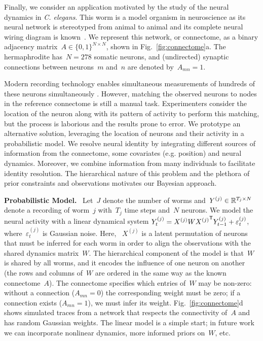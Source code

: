 \documentclass[twoside]{article}
\DeclareRobustCommand{\parhead}[1]{\textbf{#1}~}
\begin{document}
Finally, we consider an application motivated by the study of the
neural dynamics in \textit{C. elegans}. This worm is a model organism
in neuroscience as its neural network is stereotyped from animal to
animal and its complete neural wiring diagram is
known~\citep{varshney2011structural}.  We represent this network, or
connectome, as a binary adjacency
matrix~${A \in \{0,1\}^{N \times N}}$, shown in
Fig.~\ref{fig:connectome}a. The hermaphrodite has~${N=278}$ somatic
neurons, and (undirected) synaptic connections between neurons~$m$
and~$n$ are denoted by~$A_{mn}=1$.


Modern recording technology enables simultaneous measurements of
hundreds of these neurons simultaneously \citep{Kato2015,
  nguyen2016whole}.  However, matching the observed neurons to nodes
in the reference connectome is still a manual task.  Experimenters
consider the location of the neuron along with its pattern of activity
to perform this matching, but the process is laborious and the results
prone to error. We prototype an alternative solution, leveraging the
location of neurons and their activity in a probabilistic model. We
resolve neural identity by integrating different sources of
information from the connectome, some covariates (e.g. position) and
neural dynamics. Moreover, we combine information from many
individuals to facilitate identity resolution.  The hierarchical
nature of this problem and the plethora of prior constraints and
observations motivates our Bayesian approach.

\parhead{Probabilistic Model.}  Let~$J$ denote the number of worms
and~${Y^{(j)} \in \mathbb{R}^{T_j \times N}}$ denote a recording of
worm~$j$ with~$T_j$ time steps and~$N$ neurons.  We model the neural
activity with a linear dynamical system
${Y^{(j)}_t = {X^{(j)}} W {X^{(j)}}^{\mathsf{T}}
  Y^{(j)}_{t-1}+\varepsilon^{(j)}_t}$, where~$\varepsilon_t^{(j)}$ is Gaussian noise.
Here, ~$X^{(j)}$ is a latent permutation of neurons that must be
inferred for each worm in order to align the observations with the
shared dynamics matrix~$W$.  The hierarchical component of the model
is that~$W$ is shared by all worms, and it encodes the influence of
one neuron on another (the rows and columns of~$W$ are ordered in the
same way as the known connectome~$A$). The connectome specifies which
entries of~$W$ may be non-zero: without a connection (${A_{mn}=0}$)
the corresponding weight must be zero; if a connection exists (${A_{mn}=1}$),
we must infer its weight.  Fig.~\ref{fig:connectome}d shows
simulated traces from a network that respects the connectivity of~$A$
and has random Gaussian weights.  The linear model is a simple start;
in future work we can incorporate nonlinear dynamics, more informed
priors on~$W$, etc.
\end{document}
